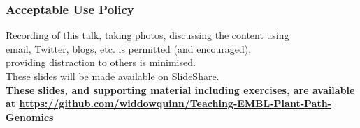
%
\begin{frame}
  \frametitle{Acceptable Use Policy}
  Recording of this talk, taking photos, discussing the content using \\
  email, Twitter, blogs, etc. is permitted (and encouraged), \\
  providing distraction to others is minimised. \\[0.5cm]
  These slides will be made available on SlideShare. \\[0.5cm]
  \textbf{These slides, and supporting material including exercises, are available at \href{https://github.com/widdowquinn/Teaching-EMBL-Plant-Path-Genomics}{https://github.com/widdowquinn/Teaching-EMBL-Plant-Path-Genomics}}
\end{frame}